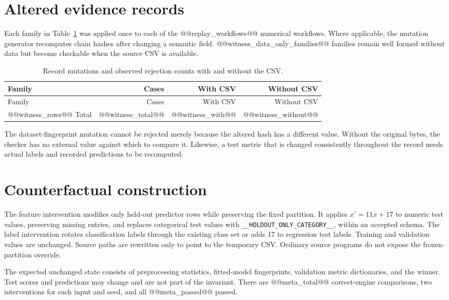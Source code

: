 \documentclass[11pt,letterpaper]{article}
\begin{document}
\section{Altered evidence records}
Each family in Table~\ref{tab:mutations} was applied once to each of the @@replay_workflows@@ numerical workflows. Where applicable, the mutation generator recomputes chain hashes after changing a semantic field. @@witness_data_only_families@@ families remain well formed without data but become checkable when the source CSV is available.

\begin{longtable}{p{}rrr}
\caption{Record mutations and observed rejection counts with and without the CSV.}\label{tab:mutations}\\
\toprule Family & Cases & With CSV & Without CSV\\\midrule\endfirsthead
\toprule Family & Cases & With CSV & Without CSV\\\midrule\endhead
@@witness_rows@@
\midrule Total & @@witness_total@@ & @@witness_with@@ & @@witness_without@@\\\bottomrule
\end{longtable}
The dataset-fingerprint mutation cannot be rejected merely because the altered hash has a different value. Without the original bytes, the checker has no external value against which to compare it. Likewise, a test metric that is changed consistently throughout the record needs actual labels and recorded predictions to be recomputed.

\section{Counterfactual construction}
The feature intervention modifies only held-out predictor rows while preserving the fixed partition. It applies $x' = 11x+17$ to numeric test values, preserving missing entries, and replaces categorical test values with \texttt{\_\_HOLDOUT\_ONLY\_CATEGORY\_\_}, within an accepted schema. The label intervention rotates classification labels through the existing class set or adds 17 to regression test labels. Training and validation values are unchanged. Source paths are rewritten only to point to the temporary CSV. Ordinary source programs do not expose the frozen-partition override.

The expected unchanged state consists of preprocessing statistics, fitted-model fingerprints, validation metric dictionaries, and the winner. Test scores and predictions may change and are not part of the invariant. There are @@meta_total@@ correct-engine comparisons, two interventions for each input and seed, and all @@meta_passed@@ passed.
\end{document}

